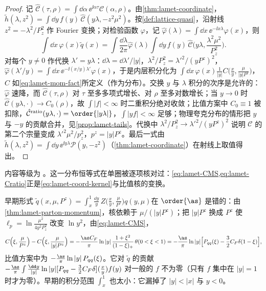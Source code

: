 \begin{proof}
记 $\hat{\mathcal C}(\tau,\rho)=\int\dd\alpha\,\ee^{\ii\alpha\tau}\mathcal C(\alpha,\rho)$。由\cref{thm:lamet-coordinate}，$\tilde h(\lambda,z^2)=\int\dd y\,f(y)\,\hat{\mathcal C}(y\lambda,-z^2\mu^2)$。按\cref{def:lattice-quasi}，沿射线 $z^2=-\lambda^2/P_z^2$ 作 Fourier 变换；对检验函数 $\varphi$，记 $\hat\varphi(\lambda)=\int\dd x\,\ee^{-\ii x\lambda}\varphi(x)$，则
\[
\int\dd x\,\varphi(x)\tilde q(x)=\int\frac{\dd\lambda}{2\pi}\hat\varphi(\lambda)\int\dd y\,f(y)\,\hat{\mathcal C}\Big(y\lambda,\frac{\lambda^2\mu^2}{P_z^2}\Big).
\]
对每个 $y\neq0$ 作代换 $\lambda'=y\lambda$：$\dd\lambda=\dd\lambda'/|y|$，$\lambda^2/P_z^2=\lambda'^2/(yP^z)^2$，$\hat\varphi(\lambda'/y)=\int\dd x\,\ee^{-\ii(x/y)\lambda'}\varphi(x)$，于是内层积分化为 $\int\dd x\,\varphi(x)\frac1{|y|}C\big(\frac xy,\frac\mu{|y|P^z}\big)$，$C$ 如\cref{eq:lamet-mom-fact}所定义（作为分布）。交换 $y$ 与 $\lambda$ 积分的次序是允许的：$\hat\varphi$ 速降，而 $\hat{\mathcal C}(\tau,\rho)$ 对 $\tau$ 至多多项式增长、对 $\rho$ 至多对数增长；当 $y\to0$ 时 $\hat{\mathcal C}(y\lambda,\cdot)\to C_0(\rho)$，故 $\int|f|<\infty$ 时二重积分绝对收敛；比值方案中 $C_0\equiv1$ 被扣除，$\hat{\mathcal C}^{\rm ratio}(y\lambda,\cdot)=\order{|y\lambda|}$，$\int|yf|<\infty$ 足够；物理夸克分布的情形把 $y$ 与 $-y$ 的贡献合并，见\cref{prop:lamet-tails}。代换中 $\lambda^2/P_z^2\to\lambda'^2/(yP^z)^2$ 说明 $\mathcal C$ 的第二个宗量变成 $\lambda'^2\mu^2/p_z^2$，$p^z=|y|P^z$。最后一式由 $\tilde h(\lambda,z^2)=\int\dd y\,\ee^{\ii y\lambda}\mathcal P(y,-z^2)$（\cref{thm:lamet-coordinate}）在射线上取值得出。
\end{proof}

内容等级为 \tagA。这一分布恒等式在单圈被逐项核对过：\cref{eq:lamet-CMS,eq:lamet-Cratio}正是\cref{eq:lamet-coord-kernel}与比值核的变换。

\begin{remark}\label{rem:lamet-early-form}
早期形式 $\tilde q(x,\mu,P^z)=\int_x^1\frac{\dd y}y\,Z\big(\frac xy,\frac\mu{P^z}\big)q(y,\mu)$\cite[式~(11)]{Ji2013}在 $\order{\as}$ 是错的：由\cref{thm:lamet-parton-momentum}，核依赖于 $\mu/(|y|P^z)$；把 $|y|P^z$ 换成 $P^z$ 使 $\ell_p=\ln\frac{\mu^2}{4y^2P_z^2}$ 改变 $\ln y^2$，由\cref{eq:lamet-CMS}，
\begin{equation}\label{eq:lamet-early-diff}
C\Big(\xi,\frac\mu{P^z}\Big)-C\Big(\xi,\frac\mu{|y|P^z}\Big)=-\frac{\as C_F}\pi\ln|y|\,\frac{1+\xi^2}{(1-\xi)_+}\,\theta(0<\xi<1)=-\frac{\as}\pi\ln|y|\Big[P_{qq}(\xi)-\frac32C_F\delta(1-\xi)\Big],
\end{equation}%
比值方案中为 $-\frac{\as}\pi\ln|y|\,P_{qq}(\xi)$。它对 $\tilde q$ 的贡献 $-\frac{\as}\pi\int\frac{\dd y}{|y|}\ln|y|[P_{qq}-\frac32C_F\delta](\frac xy)f(y)$ 对一般的 $f$ 不为零（只有 $f$ 集中在 $|y|=1$ 时才为零）。早期的积分范围 $\int_x^1$ 也太小：它漏掉了 $|y|<|x|$ 与 $y<0$。
\end{remark}

